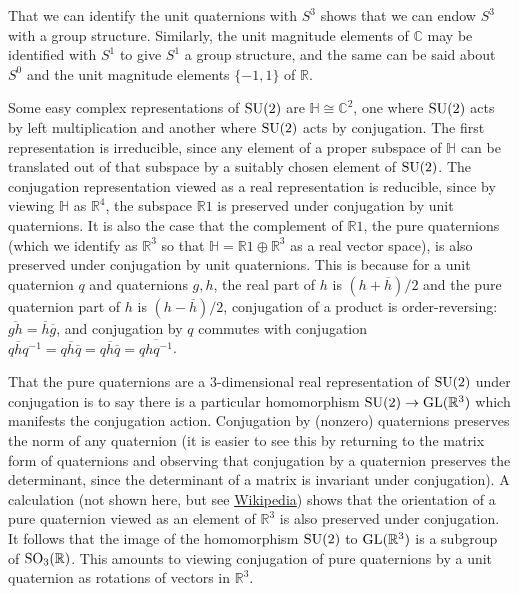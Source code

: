 \documentclass[../../rtnotes.tex]{subfiles}
\begin{document}
That we can identify the unit quaternions with $S^3$ shows that we can endow $S^3$ with a group structure. Similarly, the unit magnitude elements of $\mathbb C$ may be identified with $S^1$ to give $S^1$ a group structure, and the same can be said about $S^0$ and the unit magnitude elements $\{-1,1\}$ of $\mathbb R$.

Some easy complex representations of $\operatorname{SU}(2)$ are $\mathbb H\cong\mathbb C^2$, one where $\operatorname{SU}(2)$ acts by left multiplication and another where $\operatorname{SU}(2)$ acts by conjugation. The first representation is irreducible, since any element of a proper subspace of $\mathbb H$ can be translated out of that subspace by a suitably chosen element of $\operatorname{SU}(2)$. The conjugation representation viewed as a real representation is reducible, since by viewing $\mathbb H$ as $\mathbb R^4$, the subspace $\mathbb R1$ is preserved under conjugation by unit quaternions. It is also the case that the complement of $\mathbb R1$, the pure quaternions (which we identify as $\mathbb R^3$ so that $\mathbb H = \mathbb R1\oplus \mathbb R^3$ as a real vector space), is also preserved under conjugation by unit quaternions. This is because for a unit quaternion $q$ and quaternions $g,h$, the real part of $h$ is $(h+\overline{h})/2$ and the pure quaternion part of $h$ is $(h-\overline{h})/2$, conjugation of a product is order-reversing: $\overline{gh}= \overline{h}\overline{g}$, and conjugation by $q$ commutes with conjugation $q\overline{h}q^{-1} = q\overline{h}\overline{q} = \overline{qh\overline{q}} = \overline{qhq^{-1}}$.

That the pure quaternions are a $3$-dimensional real representation of $\operatorname{SU}(2)$ under conjugation is to say there is a particular homomorphism $\operatorname{SU}(2)\to\operatorname{GL}(\mathbb R^3)$ which manifests the conjugation action. Conjugation by (nonzero) quaternions preserves the norm of any quaternion (it is easier to see this by returning to the matrix form of quaternions and observing that conjugation by a quaternion preserves the determinant, since the determinant of a matrix is invariant under conjugation). A calculation (not shown here, but see \href{https://en.wikipedia.org/wiki/Versor#Representation_of_SO(3)}{Wikipedia}) shows that the orientation of a pure quaternion viewed as an element of $\mathbb R^3$ is also preserved under conjugation. It follows that the image of the homomorphism $\operatorname{SU}(2)$ to $\operatorname{GL}(\mathbb R^3)$ is a subgroup of $\operatorname{SO}_3(\mathbb R)$. This amounts to viewing conjugation of pure quaternions by a unit quaternion as rotations of vectors in $\mathbb R^3$.
\end{document}
